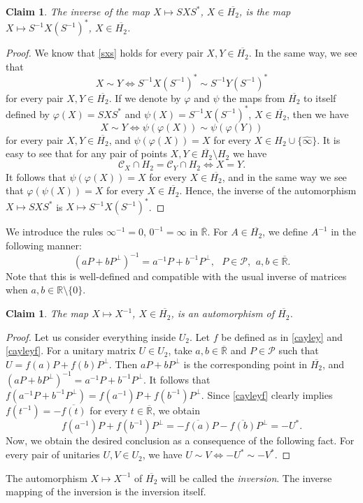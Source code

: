\documentclass[10pt]{amsart}
\newtheorem{claim}[theorem]{Claim}
\theoremstyle{definition}
\theoremstyle{remark}
\numberwithin{subsection}{section}
\numberwithin{equation}{section}
\newcommand\cP{{\mathcal{P}}}
\newcommand\bR{{\mathbb{R}}}
\newcommand\oH{{\overline{H_2}}}
\newcommand\oi{{\widehat{\infty}}}
\newcommand\oR{{\overline{\mathbb{R}}}}
\begin{document}
\begin{claim}\label{SS-1}
The inverse of the map $X \mapsto SXS^\ast $, $X \in \oH$,  is the map $X \mapsto S^{-1}X(S^{-1})^\ast$, $X \in \oH$. 
\end{claim}
\begin{proof}
We know that \eqref{sxs} holds for every pair $X,Y \in \oH$. 
In the same way, we see that 
\[
X \sim Y \iff S^{-1}X(S^{-1})^\ast \sim  S^{-1}Y(S^{-1})^\ast
\]
for every pair $X,Y \in \oH$.
If we denote by $\varphi$ and $\psi$ the maps from $\oH$ to itself defined by $\varphi (X) = SXS^\ast$ and $\psi (X) =  S^{-1}X(S^{-1})^\ast$, $X \in \oH$, then 
we have 
\[
X \sim Y \iff \psi ( \varphi (X)) \sim \psi (\varphi (Y))
\]
for every pair $X,Y \in \oH$, and $\psi (\varphi  (X)) = X$ for every $X \in H_2 \cup \{ {\oi} \}$.
It is easy to see that for any pair of points $X,Y \in \oH\setminus H_2$ we have 
\begin{equation}\label{mrda}
\mathcal{C}_X \cap H_2 = \mathcal{C}_Y \cap H_2 \iff X=Y.
\end{equation}
It follows that  $\psi (\varphi  (X)) = X$ for every $X \in \oH$, and in the same way we see that $\varphi (\psi  (X)) = X$ for every $X \in \oH$.
Hence, the inverse of the automorphism $X \mapsto SXS^\ast$ is $X \mapsto S^{-1} X (S^{-1})^\ast$.
\end{proof}

We introduce the rules $\infty^{-1}= 0$, $0^{-1}=\infty$ in ${\oR}$.
For $A\in \oH$, we define $A^{-1}$  in the following manner:
\[
(aP +bP^{\perp})^{-1} = a^{-1} P+ b^{-1} P^{\perp}, \ \ \ P\in \mathcal{P}, \ \, a, b \in  {\oR}.
\]
Note that this is well-defined and compatible with the usual inverse of matrices when $a, b\in \bR\setminus \{0\}$.
\begin{claim}\label{cl}
The map $X \mapsto X^{-1}$, $X \in \oH$, is an automorphism of $\oH$. 
\end{claim}
\begin{proof}
Let us consider everything inside $U_2$. 
Let $f$ be defined as in \eqref{cayley} and \eqref{cayleyf}.
For a unitary matrix $U\in U_2$, take $a,b\in {\oR}$ and $P\in \cP$ such that $U=f(a) P + f(b) P^\perp$.
Then $aP+bP^\perp$ is the corresponding point in $\oH$, and $(aP+bP^\perp)^{-1}=a^{-1}P+b^{-1}P^\perp$. 
It follows that $f(a^{-1}P+b^{-1}P^\perp)=f(a^{-1})P+f(b^{-1})P^\perp$. 
Since \eqref{cayleyf} clearly implies $f(t^{-1})=-\overline{f(t)}$ for every $t\in {\oR}$, we obtain 
\[
f(a^{-1})P+f(b^{-1})P^\perp = -\overline{f(a)}P - \overline{f(b)}P^\perp = -U^*. 
\]
Now, we obtain the desired conclusion as a consequence of the following fact.  
For every pair of unitaries $U, V\in U_2$, we have $U \sim V \iff -U^* \sim -V^*$.
\end{proof}
The automorphism $X\mapsto X^{-1}$ of $\oH$ will be called the \emph{inversion}.
The inverse mapping of the inversion is the inversion itself.
\end{document}
